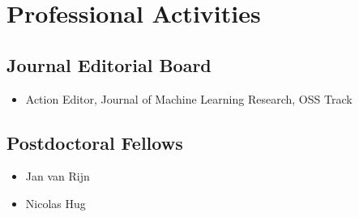 \documentclass[a4paper,11pt]{article}
\begin{document}
\section{Professional Activities}
\subsection{Journal Editorial Board}
\begin{itemize}
    \item Action Editor, Journal of Machine Learning Research, OSS Track
\end{itemize}
\subsection{Postdoctoral Fellows}
\begin{itemize}
    \item Jan van Rijn
    \item Nicolas Hug
\end{itemize}
\begin{publications}
\end{publications}
\end{document}
